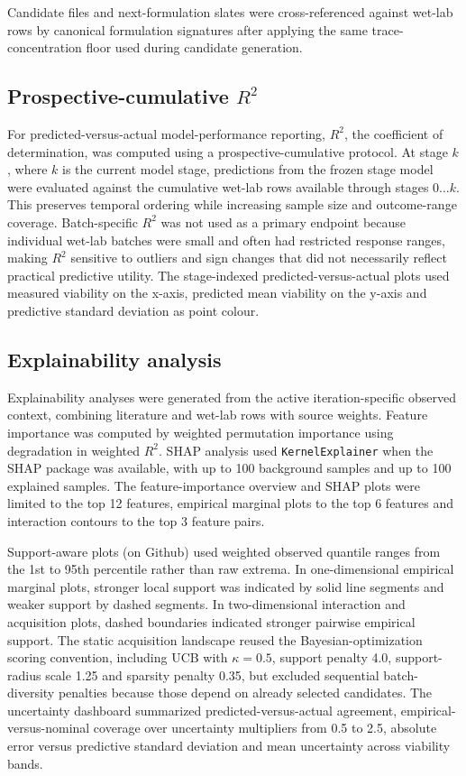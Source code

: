 \documentclass[preprint,12pt]{elsarticle}
\begin{document}
Candidate files and next-formulation slates were cross-referenced against wet-lab rows by canonical formulation signatures after applying the same trace-concentration floor used during candidate generation.

\subsection{\texorpdfstring{Prospective-cumulative $R^2$}{Prospective-cumulative R2}}

For predicted-versus-actual model-performance reporting, $R^2$, the coefficient of determination, was computed using a prospective-cumulative protocol. At stage \(k\), where \(k\) is the current model stage, predictions from the frozen stage model were evaluated against the cumulative wet-lab rows available through stages \(0 \ldots k\). This preserves temporal ordering while increasing sample size and outcome-range coverage. Batch-specific $R^2$ was not used as a primary endpoint because individual wet-lab batches were small and often had restricted response ranges, making $R^2$ sensitive to outliers and sign changes that did not necessarily reflect practical predictive utility. The stage-indexed predicted-versus-actual plots used measured viability on the x-axis, predicted mean viability on the y-axis and predictive standard deviation as point colour.

\subsection{Explainability analysis}

Explainability analyses were generated from the active iteration-specific observed context, combining literature and wet-lab rows with source weights. Feature importance was computed by weighted permutation importance using degradation in weighted $R^2$. SHAP analysis used \texttt{KernelExplainer} when the SHAP package was available, with up to 100 background samples and up to 100 explained samples. The feature-importance overview and SHAP plots were limited to the top 12 features, empirical marginal plots to the top 6 features and interaction contours to the top 3 feature pairs.

Support-aware plots (on Github) used weighted observed quantile ranges from the 1st to 95th percentile rather than raw extrema. In one-dimensional empirical marginal plots, stronger local support was indicated by solid line segments and weaker support by dashed segments. In two-dimensional interaction and acquisition plots, dashed boundaries indicated stronger pairwise empirical support. The static acquisition landscape reused the Bayesian-optimization scoring convention, including UCB with \(\kappa=0.5\), support penalty 4.0, support-radius scale 1.25 and sparsity penalty 0.35, but excluded sequential batch-diversity penalties because those depend on already selected candidates. The uncertainty dashboard summarized predicted-versus-actual agreement, empirical-versus-nominal coverage over uncertainty multipliers from 0.5 to 2.5, absolute error versus predictive standard deviation and mean uncertainty across viability bands.
\end{document}
